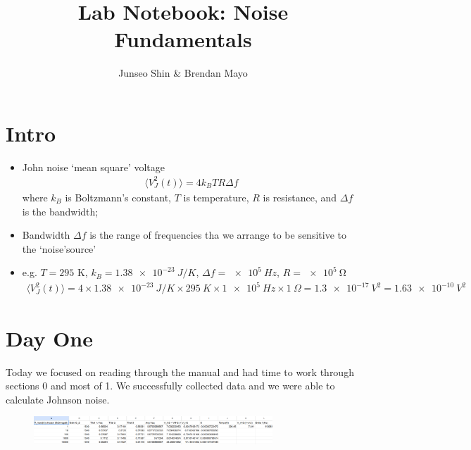 \documentclass{article}
\author{Junseo Shin \& Brendan Mayo}
\date{}
\title{Lab Notebook: Noise Fundamentals}
\begin{document}
\maketitle
\tableofcontents
\pagebreak


\pagestyle{fancy}

\section*{Intro}

\begin{itemize}
    \item John noise `mean square' voltage
    \begin{align*}
        \langle V_J^2 (t) \rangle = 4k_B TR\Delta f
    \end{align*}
    where $k_B$ is Boltzmann's constant, $T$ is temperature, $R$ is resistance, and $\Delta f$ is the bandwidth;
    \item Bandwidth $\Delta f$ is the range of frequencies tha we arrange to be sensitive to the `noise'source'
    \item e.g. $T = 295$ K, $ k_B = \qty{1.38e-23}{J/K} $, $\Delta f = \qty{e5}{Hz}$, $R = \qty{e5}{\ohm}$
    \begin{align*}
        \langle V_J^2 (t)\rangle = 4 \times \qty{1.38e-23}{J/K} \times \qty{295}{K} \times \qty{1e5}{Hz} \times \qty{1}{\Omega} = \qty{1.3e-17}{V^2} = \qty{1.63e-10}{V^2}
    \end{align*}
\end{itemize}
\section*{Day One}
Today we focused on reading through the manual and had time to work through sections 0 and most of 1. We successfully collected data and we were able to calculate Johnson noise.
\begin{figure}[h]
    \centering
    \includegraphics[width=0.8\textwidth]{lab_notebook/day1.PNG}
   
    \label{Section 1 data}
\end{figure}
\end{document}
